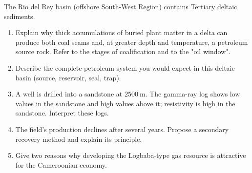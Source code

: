 \documentclass[11pt]{article}
\begin{document}
\begin{exercice}
The Rio del Rey basin (offshore South-West Region) contains Tertiary deltaic sediments.
\begin{enumerate}
\item Explain why thick accumulations of buried plant matter in a delta can produce both coal seams and, at greater depth and temperature, a petroleum source rock. Refer to the stages of coalification and to the "oil window".
\item Describe the complete petroleum system you would expect in this deltaic basin (source, reservoir, seal, trap).
\item A well is drilled into a sandstone at $2500\ \mathrm{m}$. The gamma-ray log shows low values in the sandstone and high values above it; resistivity is high in the sandstone. Interpret these logs.
\item The field's production declines after several years. Propose a secondary recovery method and explain its principle.
\item Give two reasons why developing the Logbaba-type gas resource is attractive for the Cameroonian economy.
\end{enumerate}
\end{exercice}
\end{document}
